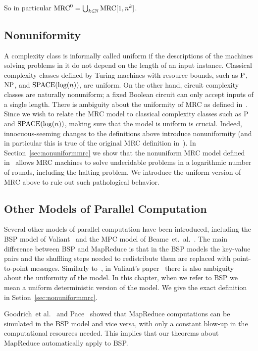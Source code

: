 So in particular $\mrc^0=\bigcup_{k\in\N}\text{MRC}[1,n^k]$. 

\subsection{Nonuniformity}  \label{subsec:nonuniformity}

A complexity class is informally called uniform if the descriptions of the
machines solving problems in it do not depend on the length of an input
instance. Classical complexity classes defined by Turing machines with resource
bounds, such as $\P$, $\NP$, and $\L$, are uniform. On the other hand, circuit
complexity classes are naturally nonuniform; a fixed Boolean circuit can only
accept inputs of a single length. There is ambiguity about the uniformity of
MRC as defined in~\cite{Karloff10}. Since we wish to relate the MRC model to
classical complexity classes such as $\P$ and $\L$, making sure that the model
is uniform is crucial. Indeed, innocuous-seeming changes to the definitions
above introduce nonuniformity (and in particular this is true of the original
MRC definition in~\cite{Karloff10}). In Section~\ref{sec:nonuniformmrc} we show
that the nonuniform MRC model defined in~\cite{Karloff10} allows MRC machines
to solve undecidable problems in a logarithmic number of rounds, including the
halting problem. We introduce the uniform version of MRC above to rule out such
pathological behavior.

\subsection{Other Models of Parallel Computation} \label{subsec:bspmodel}

Several other models of parallel computation have been introduced, including
the BSP model of Valiant~\cite{Valiant90} and the MPC model of
Beame~et.~al.~\cite{BeameKS13}.  The main difference between BSP and MapReduce
is that in the BSP models the key-value pairs and the shuffling steps needed to
redistribute them are replaced with point-to-point messages.  Similarly
to~\cite{Karloff10}, in Valiant's paper~\cite{Valiant90} there is also
ambiguity about the uniformity of the model. In this chapter, when we refer to
BSP we mean a uniform deterministic version of the model. We give the exact
definition in Setion~\ref{sec:nonuniformmrc}.

Goodrich~et al.~\cite{GoodrichSZ11} and Pace~\cite{Pace12} showed that
MapReduce computations can be simulated in the BSP model and vice versa, with
only a constant blow-up in the computational resources needed.  This implies
that our theorems about MapReduce automatically apply to BSP.

